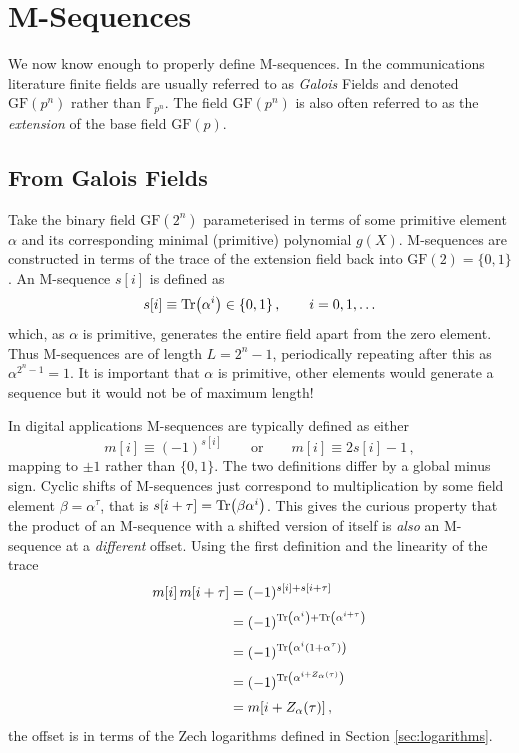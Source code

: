 \documentclass[twocolumn]{revtex4-2}
\begin{document}
\section{M-Sequences}
We now know enough to properly define M-sequences. In the communications literature finite fields are usually referred to as \emph{Galois} Fields and denoted $\text{GF}(p^n)$ rather than $\mathbb{F}_{p^n}$.
The field $\text{GF}(p^n)$ is also often referred to as the \emph{extension} of the base field $\text{GF}(p)$.

\subsection{From Galois Fields}
Take the binary field $\text{GF}(2^n)$ parameterised in terms of some primitive element $\alpha$ and its corresponding minimal (primitive) polynomial $g(X)$.
M-sequences are constructed in terms of the trace of the extension field back into $\text{GF}(2) = \{0,1\}$. An M-sequence $s[i]$ is defined as
\begin{equation}
    s[i] \equiv \Tr(\alpha^i) \in \{0,1\} \, , \qquad i = 0, 1, \ldots
\end{equation}
which, as $\alpha$ is primitive, generates the entire field apart from the zero element. Thus M-sequences are of length $L=2^n-1$, periodically repeating after this as $\alpha^{2^n - 1} = 1$.
It is important that $\alpha$ is primitive, other elements would generate a sequence but it would not be of maximum length!

In digital applications M-sequences are typically defined as either 
\begin{equation}
m[i] \equiv (-1)^{s[i]} \qquad \text{or} \qquad m[i] \equiv 2s[i]-1 \, ,
\end{equation}
mapping to $\pm 1$ rather than $\{0,1\}$. The two definitions differ by a global minus sign.
Cyclic shifts of M-sequences just correspond to multiplication by some field element $\beta = \alpha^\tau$, that is $s[i+\tau] = \Tr(\beta \alpha^i)$. 
This gives the curious property that the product of an M-sequence with a shifted version of itself is \emph{also} an M-sequence at a \emph{different} offset. Using the first definition and the linearity of the trace
\begin{alignat}{2}
    m[i] \, m[i+\tau] &= (-1)^{s[i]+s[i+\tau]} \\[0.1cm]
    &= (-1)^{\Tr(\alpha^i) + \Tr(\alpha^{i+\tau})} \nonumber \\[0.1cm]
    & = (-1)^{\Tr(\alpha^i (1+ \alpha^\tau))} \nonumber \\[0.1cm]
    &= (-1)^{\Tr( \alpha^{i+Z_\alpha(\tau)})} \nonumber \\[0.1cm]
    & = m[i+ Z_\alpha(\tau)] \, , \nonumber 
\end{alignat}
the offset is in terms of the Zech logarithms defined in Section \ref{sec:logarithms}.
\end{document}
